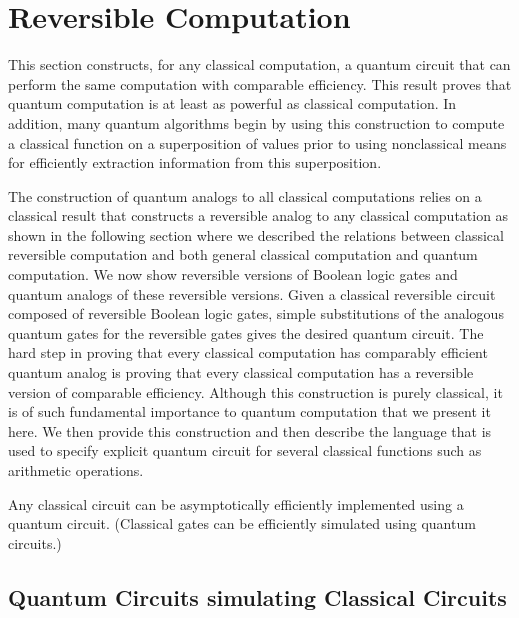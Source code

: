 \section{Reversible Computation}
This section constructs, for any classical computation, a quantum circuit that can perform the same computation with comparable efficiency. This result proves that quantum computation is at least as powerful as classical computation. In addition, many quantum algorithms begin by using this construction to compute a classical function on a superposition of values prior to using nonclassical means for efficiently extraction information from this superposition.

The construction of quantum analogs to all classical computations relies on a classical result that constructs a reversible analog to any classical computation as shown in the following section where we described the relations between classical reversible computation and both general classical computation and quantum computation. We now show reversible versions of Boolean logic gates and quantum analogs of these reversible versions. Given a classical reversible circuit composed of reversible Boolean logic gates, simple substitutions of the analogous quantum gates for the reversible gates gives the desired quantum circuit. The hard step in proving that every classical computation has comparably efficient quantum analog is proving that every classical computation has a reversible version of comparable efficiency. Although this construction is purely classical, it is of such fundamental importance to quantum computation that we present it here. We then provide this construction and then describe the language that is used to specify explicit quantum circuit for several classical functions such as arithmetic operations.

Any classical circuit can be asymptotically efficiently implemented using a quantum circuit. (Classical gates can be efficiently
simulated using quantum circuits.)

\subsection{Quantum Circuits simulating Classical Circuits}

